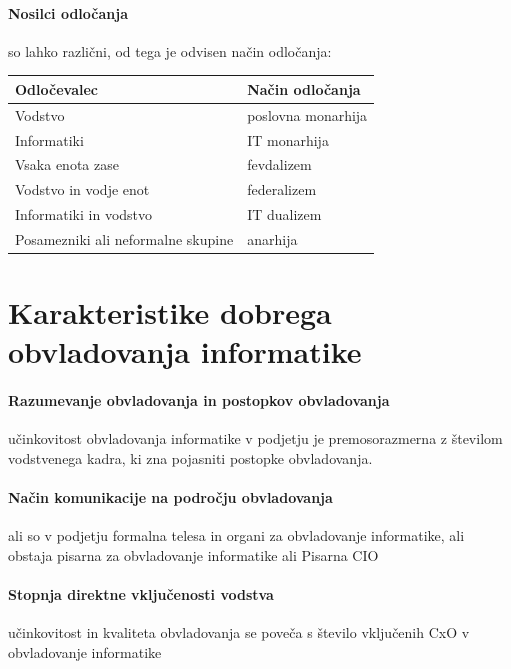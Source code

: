 \documentclass[a4paper,12pt]{report}
\begin{document}
\paragraph{Nosilci odločanja} so lahko različni, od tega je odvisen način odločanja:

\begin{center}
   \begin{tabular}{||l|l||}
      \hline
      \textbf{Odločevalec} & \textbf{Način odločanja} \\
      \hline
      Vodstvo & poslovna monarhija \\
      Informatiki & IT monarhija \\
      Vsaka enota zase & fevdalizem \\
      Vodstvo in vodje enot & federalizem \\
      Informatiki in vodstvo & IT dualizem \\
      Posamezniki ali neformalne skupine & anarhija \\
      \hline
   \end{tabular}
\end{center}

\section{Karakteristike dobrega obvladovanja informatike}

\paragraph{Razumevanje obvladovanja in postopkov obvladovanja} učinkovitost obvladovanja informatike v podjetju je premosorazmerna z številom vodstvenega kadra, ki zna pojasniti postopke obvladovanja.

\paragraph{Način komunikacije na področju obvladovanja} ali so v podjetju formalna telesa in organi za obvladovanje informatike, ali obstaja pisarna za obvladovanje informatike ali Pisarna CIO

\paragraph{Stopnja direktne vključenosti vodstva} učinkovitost in kvaliteta obvladovanja se poveča s število vključenih CxO v obvladovanje informatike
\end{document}

